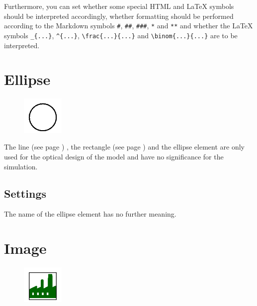 Furthermore, you can set whether some special HTML and LaTeX symbols should
be interpreted accordingly, whether formatting should be performed according to the Markdown symbols
\texttt{\#}, \texttt{\#\#}, \texttt{\#\#\#}, \texttt{*} and \texttt{**} and whether the LaTeX symbols
\texttt{\_\{...\}}, \texttt{\^{}\{...\}}, \texttt{\textbackslash frac\{...\}\{...\}} and \texttt{\textbackslash binom\{...\}\{...\}}
are to be interpreted.


\section{Ellipse}
\label{ref:ModelElementEllipse}

\begin{figure}
\vspace{-22pt}
\includegraphics[width=2cm]{imageModelElementEllipse.png}
\vspace{-22pt}
\end{figure}

The line (see page \pageref{ref:ModelElementLine}) , the rectangle (see page \pageref{ref:ModelElementRectangle}) 
and the ellipse element are only used for the optical design of the model and have no significance for the simulation.

\subsection*{Settings}

The name of the ellipse element has no further meaning.


\section{Image}
\label{ref:ModelElementImage}

\begin{figure}
\vspace{-22pt}
\includegraphics[width=2cm]{imageModelElementImage.png}
\vspace{-22pt}
\end{figure}

